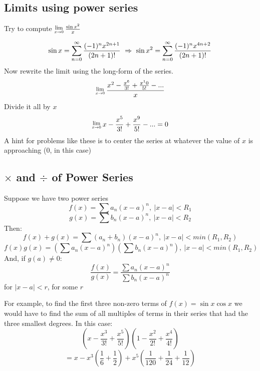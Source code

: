 \documentclass[12 pt]{article}
\begin{document}
		\subsection{Limits using power series}

		Try to compute $\Lim{x\rightarrow 0}\frac{\sin{x^2}}{x}$

		$$\sin{x}=\sum\limits_{n=0}^{\infty} \frac{(-1)^nx^{2n+1}}{(2n+1)!}\ \Rightarrow\ \sin{x^2}=\sum\limits_{n=0}^{\infty} \frac{(-1)^nx^{4n+2}}{(2n+1)!}$$
		Now rewrite the limit using the long-form of the series.
		$$\Lim{x\rightarrow 0}\frac{x^2-\frac{x^6}{3!}+\frac{x^10}{5!}-...}{x}$$
		Divide it all by $x$
		$$\Lim{x\rightarrow 0} x-\frac{x^5}{3!}+\frac{x^9}{5!}-...=0$$
		A hint for problems like these is to center the series at whatever the value of $x$ is approaching (0, in this case)

		\subsection{$\times$ and $\div$ of Power Series}

		\begin{thrm}Suppose we have two power series\\
			$$f(x)=\sum a_n(x-a)^n, \ \lvert x-a\rvert<R_1$$
			$$g(x)=\sum b_n(x-a)^n, \ \lvert x-a\rvert<R_2$$
			Then:
			$$f(x)+g(x)= \sum (a_n+b_n)(x-a)^n, \ \lvert x-a\rvert<min(R_1,R_2)$$
			$$f(x)g(x)=(\sum a_n(x-a)^n)(\sum b_n(x-a)^n), \ \lvert x-a\rvert<min(R_1,R_2)$$
			And, if $g(a)\neq 0$:
			$$\frac{f(x)}{g(x)}=\frac{\sum a_n(x-a)^n}{\sum b_n(x-a)^n}$$
			for $\lvert x-a\rvert<r$, for some $r$
		\end{thrm}
		\begin{exmp*}For example, to find the first three non-zero terms of $f(x)=\sin{x}\cos{x}$ we would have to find the sum of all multiples of terms in their series that had the three smallest degrees. In this case:
			$$(x-\frac{x^3}{3!}+\frac{x^5}{5!})(1-\frac{x^2}{2!}+\frac{x^4}{4!})$$
			$$=x-x^3(\frac{1}{6}+\frac{1}{2})+x^5(\frac{1}{120}+\frac{1}{24}+\frac{1}{12})$$
		\end{exmp*}
\end{document}
